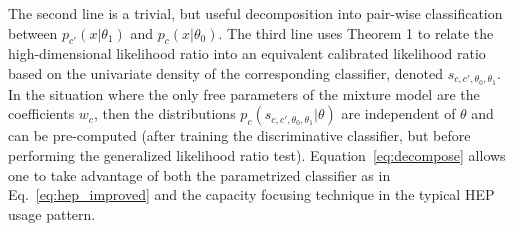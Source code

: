 \documentclass[11pt, oneside]{article}   	%
\begin{document}
The second line is a trivial, but useful decomposition into pair-wise classification between $p_{c'}(x|\theta_1)$ and $p_c(x|\theta_0)$.  The third line uses Theorem 1 to relate the high-dimensional likelihood ratio into an equivalent calibrated likelihood ratio based on the univariate density of the corresponding classifier, denoted $s_{c,c',\theta_0, \theta_1}$. In the situation where the only free parameters of the mixture model are the coefficients $w_c$, then the distributions $p_{c}(s_{c,c',\theta_0, \theta_1}| \theta)$ are independent of $\theta$ and can be pre-computed (after training the discriminative classifier, but before performing the generalized likelihood ratio test). Equation~\ref{eq:decompose} allows one to take advantage of both the parametrized classifier as in Eq.~\ref{eq:hep_improved} and the capacity focusing technique in the typical HEP usage pattern. 


%


\end{document}
